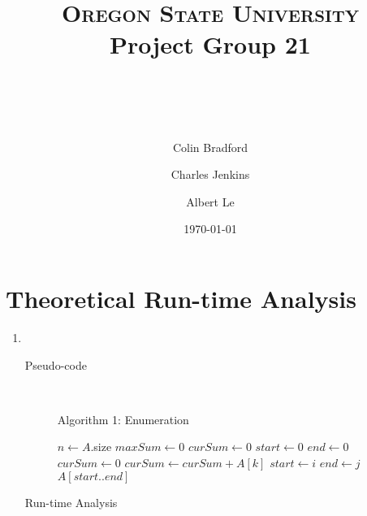 \documentclass[paper=a4, fontsize=11pt]{scrartcl} %
\title{ 
    \normalfont \normalsize 
    \textsc{Oregon State University} \\ [25pt]
    \large Project Group 21
    \horrule{0.5pt} \\[0.4cm] %
    \huge \hwtitle \\ %
    \horrule{2pt} \\[0.5cm] %
}
\author{
    Colin Bradford
    \and
    Charles Jenkins
    \and
    Albert Le
} %
\date{\normalsize\today} %
\numberwithin{equation}{section} %
\numberwithin{figure}{section} %
\numberwithin{table}{section} %
\begin{document}
\maketitle %


\section{Theoretical Run-time Analysis}
\begin{enumerate}[label=\bfseries Algorithm \arabic*:]
    \item \hfill \\
    \begin{description}
        \item[Pseudo-code] \hfill \\
        \begin{algorithmc}
            \caption{Algorithm 1: Enumeration}
                \State $n \gets A$.size
                \State $maxSum \gets 0$
                \State $curSum \gets 0$
                \State $start \gets 0$
                \State $end \gets 0$
                        \State $curSum \gets 0$
                            \State $curSum \gets curSum + A[k]$
                        \EndFor
                            \State $start \gets i$
                            \State $end \gets j$
                        \EndIf
                    \EndFor
                \EndFor
                \State \Return $A[start..end]$
            \EndFunction
        \end{algorithmc}
        \item[Run-time Analysis] \hfill \\
    \end{description}


\end{enumerate}
\end{document}

